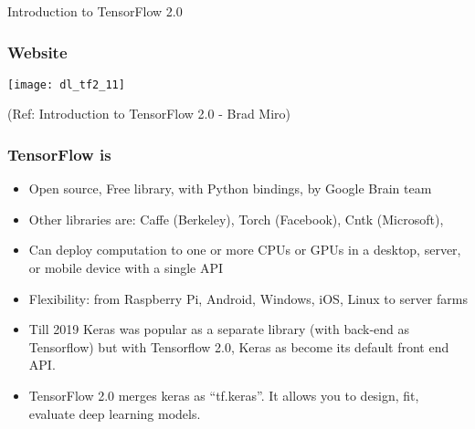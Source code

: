 \begin{frame}
  \begin{center}
    {\Large Introduction to TensorFlow 2.0}
  \end{center}
\end{frame}

\begin{frame}[fragile] \frametitle{Website}

\begin{center}
\texttt{[image: dl\_tf2\_11]}
\end{center}


\tiny{(Ref: Introduction to TensorFlow 2.0 - Brad Miro)}
\end{frame}

\begin{frame}[fragile] \frametitle{TensorFlow is}
\begin{itemize}
\item Open source, Free library, with Python bindings, by Google Brain team
\item Other libraries are: Caffe (Berkeley), Torch (Facebook), Cntk (Microsoft),
\item Can deploy computation to one or more CPUs or GPUs in a desktop, server, or mobile device with a single API
\item Flexibility: from Raspberry Pi, Android, Windows, iOS, Linux to server farms
\item Till 2019 Keras was popular as a separate library  (with back-end as Tensorflow) but with Tensorflow 2.0, Keras as become its default front end API.
\item TensorFlow 2.0 merges keras as ``tf.keras''. It allows you to design, fit, evaluate deep learning models.
\end{itemize}
\end{frame}



